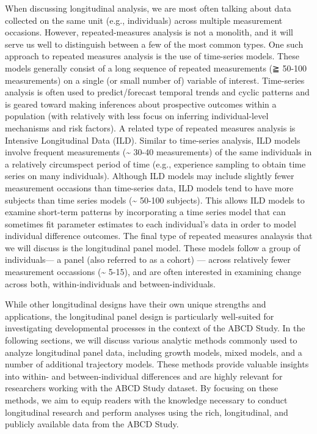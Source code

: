\documentclass[
  number,
  preprint,
  3p,
  twocolumn]{elsarticle}
\begin{document}
When discussing longitudinal analysis, we are most often talking about
data collected on the same unit (e.g., individuals) across multiple
measurement occasions. However, repeated-measures analysis is not a
monolith, and it will serve us well to distinguish between a few of the
most common types. One such approach to repeated measures analysis is
the use of time-series models. These models generally consist of a long
sequence of repeated measurements (≧ 50-100 measurements) on a single
(or small number of) variable of interest. Time-series analysis is often
used to predict/forecast temporal trends and cyclic patterns and is
geared toward making inferences about prospective outcomes within a
population (with relatively with less focus on inferring
individual-level mechanisms and risk factors). A related type of
repeated measures analysis is Intensive Longitudinal Data (ILD). Similar
to time-series analysis, ILD models involve frequent measurements
(\textasciitilde{} 30-40 measurements) of the same individuals in a
relatively circumspect period of time (e.g., experience sampling to
obtain time series on many individuals). Although ILD models may include
slightly fewer measurement occasions than time-series data, ILD models
tend to have more subjects than time series models (\textasciitilde{}
50-100 subjects). This allows ILD models to examine short-term patterns
by incorporating a time series model that can sometimes fit parameter
estimates to each individual's data in order to model individual
difference outcomes. The final type of repeated measures analaysis that
we will discuss is the longitudinal panel model. These models follow a
group of individuals--- a panel (also referred to as a cohort) ---
across relatively fewer measurement occassions (\textasciitilde{} 5-15),
and are often interested in examining change across both,
within-individuals and between-individuals.

While other longitudinal designs have their own unique strengths and
applications, the longitudinal panel design is particularly well-suited
for investigating developmental processes in the context of the ABCD
Study. In the following sections, we will discuss various analytic
methods commonly used to analyze longitudinal panel data, including
growth models, mixed models, and a number of additional trajectory
models. These methods provide valuable insights into within- and
between-individual differences and are highly relevant for researchers
working with the ABCD Study dataset. By focusing on these methods, we
aim to equip readers with the knowledge necessary to conduct
longitudinal research and perform analyses using the rich, longitudinal,
and publicly available data from the ABCD Study.
\end{document}

